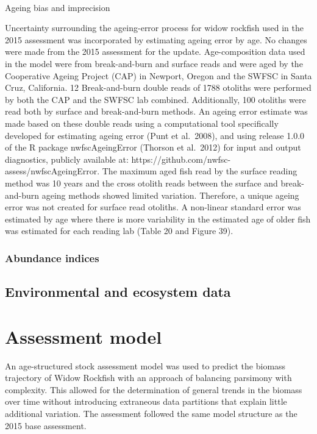 \documentclass[
]{scrartcl}
\makeatletter
\let\oldparagraph\paragraph
\renewcommand{\paragraph}{
    \@ifstar
      \xxxParagraphStar
      \xxxParagraphNoStar
  }
\newcommand{\xxxParagraphStar}[1]{\oldparagraph*{#1}\mbox{}}
\newcommand{\xxxParagraphNoStar}[1]{\oldparagraph{#1}\mbox{}}
\makeatother
\begin{document}
\paragraph{Ageing bias and
imprecision}\label{ageing-bias-and-imprecision}

Uncertainty surrounding the ageing-error process for widow rockfish used
in the 2015 assessment was incorporated by estimating ageing error by
age. No changes were made from the 2015 assessment for the update.
Age-composition data used in the model were from break-and-burn and
surface reads and were aged by the Cooperative Ageing Project (CAP) in
Newport, Oregon and the SWFSC in Santa Cruz, California. 12
Break-and-burn double reads of 1788 otoliths were performed by both the
CAP and the SWFSC lab combined. Additionally, 100 otoliths were read
both by surface and break-and-burn methods. An ageing error estimate was
made based on these double reads using a computational tool specifically
developed for estimating ageing error (Punt et al.~2008), and using
release 1.0.0 of the R package nwfscAgeingError (Thorson et al.~2012)
for input and output diagnostics, publicly available at:
https://github.com/nwfsc- assess/nwfscAgeingError. The maximum aged fish
read by the surface reading method was 10 years and the cross otolith
reads between the surface and break-and-burn ageing methods showed
limited variation. Therefore, a unique ageing error was not created for
surface read otoliths. A non-linear standard error was estimated by age
where there is more variability in the estimated age of older fish was
estimated for each reading lab (Table 20 and Figure 39).

\subsubsection{Abundance indices}\label{abundance-indices}

\subsection{Environmental and ecosystem
data}\label{environmental-and-ecosystem-data}

\newpage{}

\section{Assessment model}\label{assessment-model}

An age-structured stock assessment model was used to predict the biomass
trajectory of Widow Rockfish with an approach of balancing parsimony
with complexity. This allowed for the determination of general trends in
the biomass over time without introducing extraneous data partitions
that explain little additional variation. The assessment followed the
same model structure as the 2015 base assessment.
\end{document}
